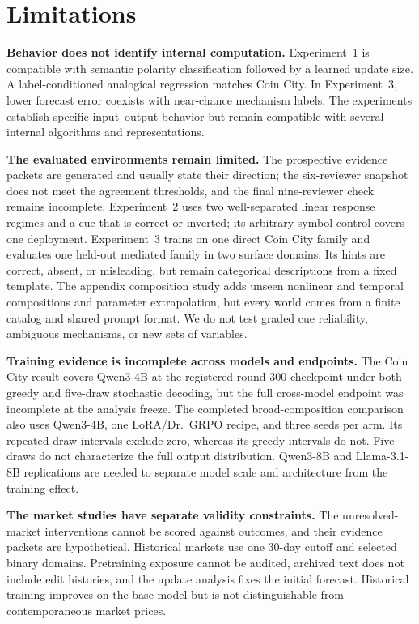\section{Limitations}
\label{sec:limitations}

\textbf{Behavior does not identify internal computation.}
Experiment~1 is compatible with semantic polarity classification followed by a
learned update size. A label-conditioned analogical regression matches Coin City.
In Experiment~3, lower forecast error coexists with near-chance mechanism labels.
The experiments establish specific input--output behavior but remain compatible
with several internal algorithms and representations.

\textbf{The evaluated environments remain limited.}
The prospective evidence packets are generated and usually state their direction;
the six-reviewer snapshot does not meet the agreement thresholds,
and the final nine-reviewer check remains incomplete. Experiment~2 uses two
well-separated linear response regimes and a cue that is correct or inverted; its
arbitrary-symbol control covers one deployment. Experiment~3 trains on one direct
Coin City family and evaluates one held-out mediated family in two surface domains.
Its hints are correct, absent, or misleading, but remain categorical descriptions
from a fixed template. The appendix composition study adds unseen nonlinear and
temporal compositions and parameter extrapolation, but every world comes from a
finite catalog and shared prompt format. We do not test graded cue reliability,
ambiguous mechanisms, or new sets of variables.

\textbf{Training evidence is incomplete across models and endpoints.}
The Coin City result covers Qwen3-4B at the registered round-300 checkpoint under
both greedy and five-draw stochastic decoding, but the full cross-model endpoint
was incomplete at the analysis freeze. The completed broad-composition comparison
also uses Qwen3-4B, one LoRA/Dr.~GRPO recipe, and three seeds per arm. Its repeated-draw intervals
exclude zero, whereas its greedy intervals do not. Five draws do not characterize
the full output distribution. Qwen3-8B and Llama-3.1-8B replications are needed to
separate model scale and architecture from the training effect.

\textbf{The market studies have separate validity constraints.}
The unresolved-market interventions cannot be scored against outcomes, and their
evidence packets are hypothetical. Historical markets use one 30-day cutoff and
selected binary domains. Pretraining exposure cannot be audited, archived text
does not include edit histories, and the update analysis fixes the initial
forecast. Historical training improves on the base model but is not distinguishable
from contemporaneous market prices.
